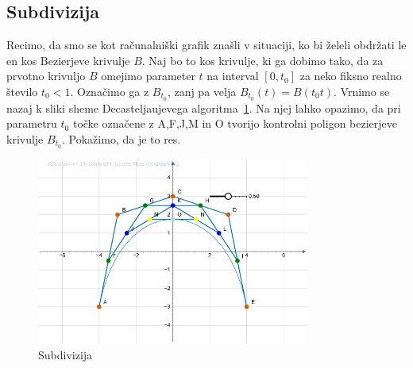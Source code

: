 \documentclass[isrm2, tisk]{fmfdelo}
\begin{document}
    \subsection{Subdivizija}
    Recimo, da smo se kot računalniški grafik znašli v situaciji, ko bi želeli obdržati le en kos Bezierjeve krivulje $B$.
    Naj bo to kos krivulje, ki ga dobimo tako, da za prvotno krivuljo $B$ omejimo parameter $t$ na interval $[0,t_0]$ za neko fiksno realno število $t_0<1$.
    Označimo ga z $B_{t_0}$, zanj pa velja $B_{t_0}(t)=B(t_{0}t)$.
    Vrnimo se nazaj k sliki sheme Decasteljaujevega algoritma~\ref{fig:subdivizija}.
    Na njej lahko opazimo, da pri parametru $t_0$ točke označene z A,F,J,M in O tvorijo kontrolni poligon bezierjeve krivulje $B_{t_0}$.
    Pokažimo, da je to res.
    \begin{figure}[h!]
        \centering
        \includegraphics[width=0.8\textwidth]{images/subidivizja.png}
        \caption{Subdivizija}
        \label{fig:subdivizija}
    \end{figure}
\end{document}
